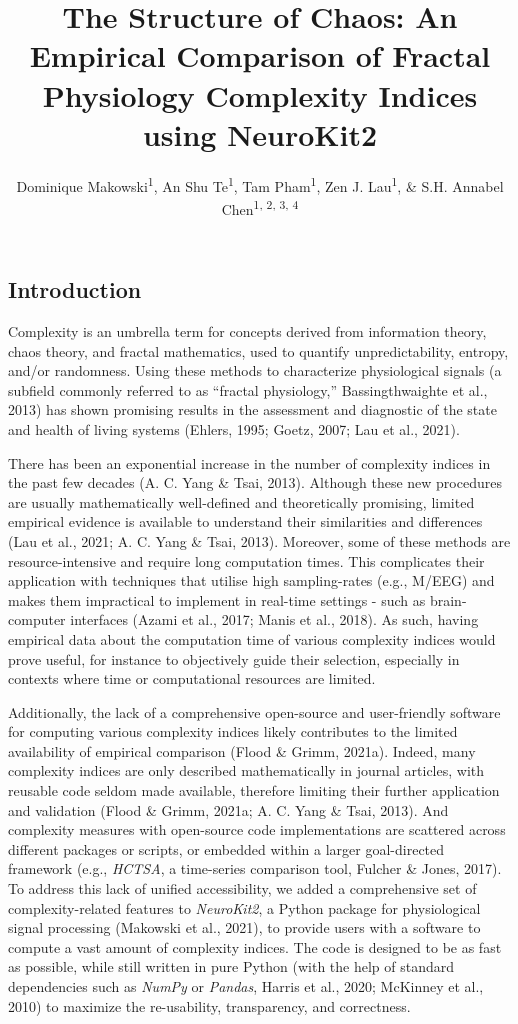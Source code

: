 \documentclass[
  man]{apa6}
\title{\textbf{The Structure of Chaos: An Empirical Comparison of Fractal Physiology Complexity Indices using NeuroKit2}}
\author{Dominique Makowski\textsuperscript{1}, An Shu Te\textsuperscript{1}, Tam Pham\textsuperscript{1}, Zen J. Lau\textsuperscript{1}, \& S.H. Annabel Chen\textsuperscript{1, 2, 3, 4}}
\date{}
\affiliation{\vspace{0.5cm}\textsuperscript{1} School of Social Sciences, Nanyang Technological University, Singapore\\\textsuperscript{2} LKC Medicine, Nanyang Technological University, Singapore\\\textsuperscript{3} National Institute of Education, Singapore\\\textsuperscript{4} Centre for Research and Development in Learning, Nanyang Technological University, Singapore}
\begin{document}
\maketitle

\hypertarget{introduction}{%
\subsection{Introduction}\label{introduction}}

Complexity is an umbrella term for concepts derived from information theory, chaos theory, and fractal mathematics, used to quantify unpredictability, entropy, and/or randomness. Using these methods to characterize physiological signals (a subfield commonly referred to as ``fractal physiology,'' Bassingthwaighte et al., 2013) has shown promising results in the assessment and diagnostic of the state and health of living systems (Ehlers, 1995; Goetz, 2007; Lau et al., 2021).

There has been an exponential increase in the number of complexity indices in the past few decades (A. C. Yang \& Tsai, 2013). Although these new procedures are usually mathematically well-defined and theoretically promising, limited empirical evidence is available to understand their similarities and differences (Lau et al., 2021; A. C. Yang \& Tsai, 2013). Moreover, some of these methods are resource-intensive and require long computation times. This complicates their application with techniques that utilise high sampling-rates (e.g., M/EEG) and makes them impractical to implement in real-time settings - such as brain-computer interfaces (Azami et al., 2017; Manis et al., 2018). As such, having empirical data about the computation time of various complexity indices would prove useful, for instance to objectively guide their selection, especially in contexts where time or computational resources are limited.

Additionally, the lack of a comprehensive open-source and user-friendly software for computing various complexity indices likely contributes to the limited availability of empirical comparison (Flood \& Grimm, 2021a). Indeed, many complexity indices are only described mathematically in journal articles, with reusable code seldom made available, therefore limiting their further application and validation (Flood \& Grimm, 2021a; A. C. Yang \& Tsai, 2013). And complexity measures with open-source code implementations are scattered across different packages or scripts, or embedded within a larger goal-directed framework (e.g., \emph{HCTSA}, a time-series comparison tool, Fulcher \& Jones, 2017). To address this lack of unified accessibility, we added a comprehensive set of complexity-related features to \emph{NeuroKit2}, a Python package for physiological signal processing (Makowski et al., 2021), to provide users with a software to compute a vast amount of complexity indices. The code is designed to be as fast as possible, while still written in pure Python (with the help of standard dependencies such as \emph{NumPy} or \emph{Pandas}, Harris et al., 2020; McKinney et al., 2010) to maximize the re-usability, transparency, and correctness.
\end{document}
